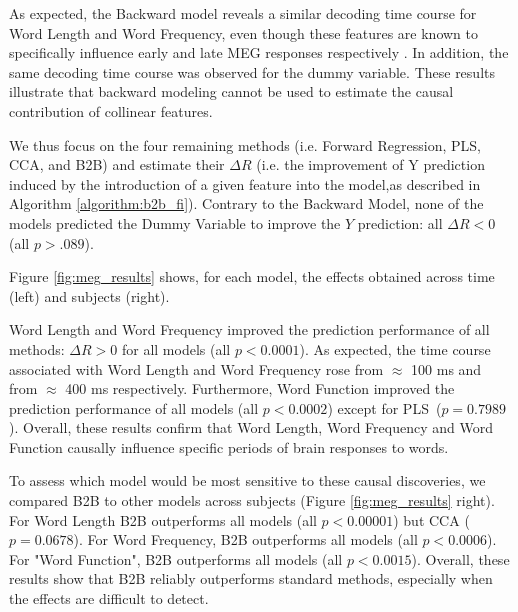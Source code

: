 As expected, the Backward model reveals a similar decoding time course for Word
Length and Word Frequency, even though these features are known to specifically
influence early and late MEG responses respectively \citep{kutas2011thirty}. In
addition, the same decoding time course was observed for the dummy variable.
These results illustrate that backward modeling cannot be used to estimate the
causal contribution of collinear features.

We thus focus on the four remaining methods (i.e. Forward Regression, PLS, CCA,
and B2B) and estimate their $\Delta R$ (i.e. the improvement of Y prediction
induced by the introduction of a given feature into the model,as described in
Algorithm \ref{algorithm:b2b_fi}). Contrary to the Backward Model, none of the
models predicted the Dummy Variable to improve the $Y$ prediction: all $\Delta R
< 0$ (all $p > .089$).

Figure \ref{fig:meg_results} shows, for each model, the effects obtained across
time (left) and subjects (right).

Word Length and Word Frequency improved the prediction performance of all
methods: $\Delta R>0$ for all models (all $p<0.0001$). As expected, the time
course associated with Word Length and Word Frequency rose from $\approx$ 100 ms
and from $\approx$ 400 ms respectively. Furthermore, Word Function improved the
prediction performance of all models (all $p < 0.0002$) except for
PLS~($p=0.7989$). Overall, these results confirm that Word Length, Word
Frequency and Word Function causally influence specific periods of brain
responses to words.

To assess which model would be most sensitive to these causal discoveries, we
compared B2B to other models across subjects (Figure \ref{fig:meg_results}
right). For Word Length B2B outperforms all models (all $p < 0.00001$) but CCA
($p=0.0678$). For Word Frequency, B2B outperforms all models (all $p < 0.0006$).
For "Word Function", B2B outperforms all models (all $p < 0.0015$). Overall,
these results show that B2B reliably outperforms standard methods, especially
when the effects are difficult to detect.
